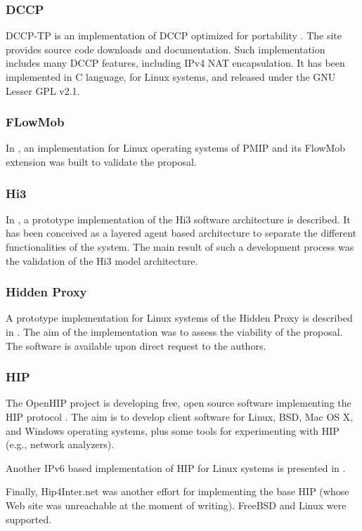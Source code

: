 \documentclass[preprint,12pt]{elsarticle}
\begin{document}
\subsubsection*{DCCP}
DCCP-TP is an implementation of DCCP optimized for portability 
\cite{dccp_imp}. The site provides source code downloads and documentation.
Such implementation includes many DCCP features, including IPv4 NAT encapsulation.
It has been implemented in C language, for Linux systems, and released under 
the GNU Lesser \ac{GPL} v2.1.

\subsubsection*{FLowMob} 
In \cite{MeliaBOGC11}, an implementation for Linux operating systems of PMIP 
and its FlowMob extension was built to validate the proposal. 

\subsubsection*{Hi3} 
In \cite{hi3}, a prototype implementation of the Hi3 software architecture is 
described. It has been conceived as a layered agent based architecture to 
separate the different functionalities of the system. The main result of such a 
development process was the validation of the Hi3 model architecture.

\subsubsection*{Hidden Proxy} 
A prototype implementation for Linux systems of the Hidden Proxy is described 
in \cite{ghi06}. The aim of the implementation was to assess the viability of 
the proposal. The software is available upon direct request to the authors.

\subsubsection*{HIP} 
The OpenHIP project is developing free, open source software implementing the 
HIP protocol \cite{openhip_tech}. The aim is to develop client software for 
Linux, BSD, Mac OS X, and Windows operating systems, plus some tools for 
experimenting with HIP (e.g., network analyzers).

Another IPv6 based implementation of HIP for Linux 
systems is presented in \cite{LundbergJanne-ols2003}.

Finally, Hip4Inter.net was another effort for implementing the base HIP (whose 
Web site was unreachable at the moment of writing). FreeBSD and 
Linux were supported.
\end{document}
